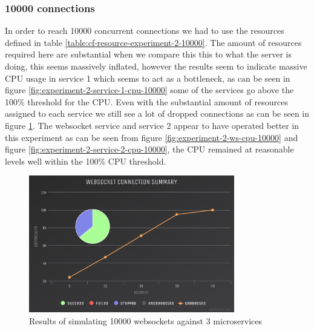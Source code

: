 \begin{table}[H]
\caption{Resources allocated to each service}
\label{table:cf-resource-experiment-2-10000}
\end{table}

\subsubsection{10000 connections}

In order to reach 10000 concurrent connections we had to use the resources defined in table \ref{table:cf-resource-experiment-2-10000}. The amount of resources required here are substantial when we compare this this to what the server is doing, this seems massively inflated, however the results seem to indicate massive CPU usage in service 1 which seems to act as a bottleneck, as can be seen in figure \ref{fig:experiment-2-service-1-cpu-10000} some of the services go above the 100\% threshold for the CPU. Even with the substantial amount of resources assigned to each service we still see a lot of dropped connections as can be seen in figure \ref{fig:experiment-2-conn-10000}. The websocket service and service 2 appear to have operated better in this experiment as can be seen from figure \ref{fig:experiment-2-ws-cpu-10000} and figure \ref{fig:experiment-2-service-2-cpu-10000}, the CPU remained at reasonable levels well within the 100\% CPU threshold.

\begin{figure}[H]
  \centering
    \includegraphics[width=0.8\textwidth]{figures/experiments/experiment-2/10000/conn-10000.png}
    \caption{Results of simulating 10000 websockets against 3 microservices}
    \label{fig:experiment-2-conn-10000}
\end{figure}

